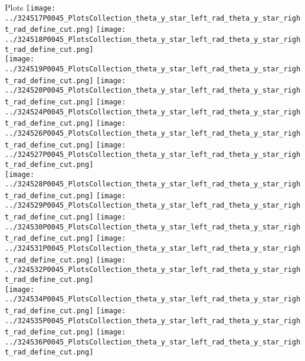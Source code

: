 \documentclass{beamer}
\begin{document}
\begin{frame}
\begin{block}{Plots}
                \texttt{[image: ../324517P0045\_PlotsCollection\_theta\_y\_star\_left\_rad\_theta\_y\_star\_right\_rad\_define\_cut.png]}
                \texttt{[image: ../324518P0045\_PlotsCollection\_theta\_y\_star\_left\_rad\_theta\_y\_star\_right\_rad\_define\_cut.png]}\\
                \texttt{[image: ../324519P0045\_PlotsCollection\_theta\_y\_star\_left\_rad\_theta\_y\_star\_right\_rad\_define\_cut.png]}
                \texttt{[image: ../324520P0045\_PlotsCollection\_theta\_y\_star\_left\_rad\_theta\_y\_star\_right\_rad\_define\_cut.png]}
                \texttt{[image: ../324524P0045\_PlotsCollection\_theta\_y\_star\_left\_rad\_theta\_y\_star\_right\_rad\_define\_cut.png]}
                \texttt{[image: ../324526P0045\_PlotsCollection\_theta\_y\_star\_left\_rad\_theta\_y\_star\_right\_rad\_define\_cut.png]}
                \texttt{[image: ../324527P0045\_PlotsCollection\_theta\_y\_star\_left\_rad\_theta\_y\_star\_right\_rad\_define\_cut.png]}\\
                \texttt{[image: ../324528P0045\_PlotsCollection\_theta\_y\_star\_left\_rad\_theta\_y\_star\_right\_rad\_define\_cut.png]}
                \texttt{[image: ../324529P0045\_PlotsCollection\_theta\_y\_star\_left\_rad\_theta\_y\_star\_right\_rad\_define\_cut.png]}
                \texttt{[image: ../324530P0045\_PlotsCollection\_theta\_y\_star\_left\_rad\_theta\_y\_star\_right\_rad\_define\_cut.png]}
                \texttt{[image: ../324531P0045\_PlotsCollection\_theta\_y\_star\_left\_rad\_theta\_y\_star\_right\_rad\_define\_cut.png]}
                \texttt{[image: ../324532P0045\_PlotsCollection\_theta\_y\_star\_left\_rad\_theta\_y\_star\_right\_rad\_define\_cut.png]}\\
                \texttt{[image: ../324534P0045\_PlotsCollection\_theta\_y\_star\_left\_rad\_theta\_y\_star\_right\_rad\_define\_cut.png]}
                \texttt{[image: ../324535P0045\_PlotsCollection\_theta\_y\_star\_left\_rad\_theta\_y\_star\_right\_rad\_define\_cut.png]}
                \texttt{[image: ../324536P0045\_PlotsCollection\_theta\_y\_star\_left\_rad\_theta\_y\_star\_right\_rad\_define\_cut.png]}

        \end{block}
\end{frame}
\end{document}
